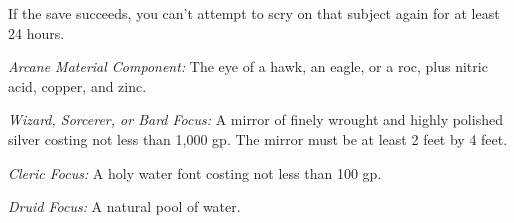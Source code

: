 If the save succeeds, you can't attempt to scry on that subject again for at least 
24 hours.

\textit{Arcane Material Component:} The eye of a hawk, an eagle, or a roc, plus 
nitric acid, copper, and zinc.

\textit{Wizard, Sorcerer, or Bard Focus:} A mirror of finely wrought and highly 
polished silver costing not less than 1,000 gp. The mirror must be at least 2 feet 
by 4 feet.

\textit{Cleric Focus:} A holy water font costing not less than 100 gp.

\textit{Druid Focus:} A natural pool of water. 

